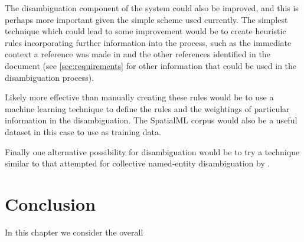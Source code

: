 \documentclass[12pt, a4paper]{report}
\begin{document}
The disambiguation component of the system could also be improved, and this is perhaps more important given the simple scheme used currently. The simplest technique which could lead to some improvement would be to create heuristic rules incorporating further information into the process, such as the immediate context a reference was made in and the other references identified in the document (see \ref{sec:requirements} for other information that could be used in the disambiguation process).

Likely more effective than manually creating these rules would be to use a machine learning technique to define the rules and the weightings of particular information in the disambiguation. The SpatialML corpus would also be a useful dataset in this case to use as training data.

Finally one alternative possibility for disambiguation would be to try a technique similar to that attempted for collective named-entity disambiguation by \citet{alhelbawy2014}.






\chapter{Conclusion}


In this chapter we consider the overall 








\end{document}
